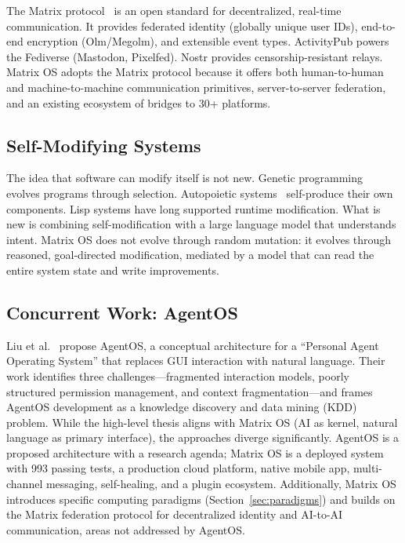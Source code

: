 \documentclass[11pt,a4paper]{article}
\begin{document}
The Matrix protocol~\cite{matrix2024spec} is an open standard for decentralized, real-time communication. It provides federated identity (globally unique user IDs), end-to-end encryption (Olm/Megolm), and extensible event types. ActivityPub powers the Fediverse (Mastodon, Pixelfed). Nostr provides censorship-resistant relays. Matrix OS adopts the Matrix protocol because it offers both human-to-human and machine-to-machine communication primitives, server-to-server federation, and an existing ecosystem of bridges to 30+ platforms.

\subsection{Self-Modifying Systems}

The idea that software can modify itself is not new. Genetic programming~\cite{koza1992genetic} evolves programs through selection. Autopoietic systems~\cite{maturana1980autopoiesis} self-produce their own components. Lisp systems have long supported runtime modification. What is new is combining self-modification with a large language model that understands intent. Matrix OS does not evolve through random mutation: it evolves through reasoned, goal-directed modification, mediated by a model that can read the entire system state and write improvements.

\subsection{Concurrent Work: AgentOS}

Liu et al.~\cite{liu2026agentos} propose AgentOS, a conceptual architecture for a ``Personal Agent Operating System'' that replaces GUI interaction with natural language. Their work identifies three challenges---fragmented interaction models, poorly structured permission management, and context fragmentation---and frames AgentOS development as a knowledge discovery and data mining (KDD) problem. While the high-level thesis aligns with Matrix OS (AI as kernel, natural language as primary interface), the approaches diverge significantly. AgentOS is a proposed architecture with a research agenda; Matrix OS is a deployed system with 993 passing tests, a production cloud platform, native mobile app, multi-channel messaging, self-healing, and a plugin ecosystem. Additionally, Matrix OS introduces specific computing paradigms (Section~\ref{sec:paradigms}) and builds on the Matrix federation protocol for decentralized identity and AI-to-AI communication, areas not addressed by AgentOS.
\end{document}
